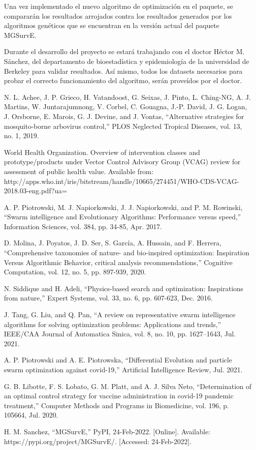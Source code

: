 \documentclass[letterpaper, 10pt, conference]{ieeeconf}
\begin{document}
Una vez implementado el nuevo algoritmo de optimización en el paquete, se compararán los resultados arrojados contra los resultados generados por los algoritmos genéticos que se encuentran en la versión actual del paquete MGSurvE. 

Durante el desarrollo del proyecto se estará trabajando con el doctor Héctor M. Sánchez, del departamento de bioestadística y epidemiología de la universidad de Berkeley para validar resultados. Así mismo, todos los datasets necesarios para probar el correcto funcionamiento del algoritmo, serán proveídos por el doctor.

\begin{thebibliography}{99}
  N. L. Achee, J. P. Grieco, H. Vatandoost, G. Seixas, J. Pinto, L. Ching-NG, A. J. Martins, W. Juntarajumnong, V. Corbel, C. Gouagna, J.-P. David, J. G. Logan, J. Orsborne, E. Marois, G. J. Devine, and J. Vontas, “Alternative strategies for mosquito-borne arbovirus control,” PLOS Neglected Tropical Diseases, vol. 13, no. 1, 2019. 
  
  World Health Organization. Overview of intervention classes and prototype/products under Vector Control Advisory Group (VCAG) review for assessment of public health value. Available from: http://apps.who.int/iris/bitstream/handle/10665/274451/WHO-CDS-VCAG-2018.03-eng.pdf?ua=

  A. P. Piotrowski, M. J. Napiorkowski, J. J. Napiorkowski, and P. M. Rowinski, “Swarm intelligence and Evolutionary Algorithms: Performance versus speed,” Information Sciences, vol. 384, pp. 34-85, Apr. 2017.  

  D. Molina, J. Poyatos, J. D. Ser, S. García, A. Hussain, and F. Herrera, “Comprehensive taxonomies of nature- and bio-inspired optimization: Inspiration Versus Algorithmic Behavior, critical analysis recommendations,” Cognitive Computation, vol. 12, no. 5, pp. 897-939, 2020. 

  N. Siddique and H. Adeli, “Physics-based search and optimization: Inspirations from nature,” Expert Systems, vol. 33, no. 6, pp. 607-623, Dec. 2016. 

  J. Tang, G. Liu, and Q. Pan, “A review on representative swarm intelligence algorithms for solving optimization problems: Applications and trends,” IEEE/CAA Journal of Automatica Sinica, vol. 8, no. 10, pp. 1627–1643, Jul. 2021.

  A. P. Piotrowski and A. E. Piotrowska, “Differential Evolution and particle swarm optimization against covid-19,” Artificial Intelligence Review, Jul. 2021. 

  G. B. Libotte, F. S. Lobato, G. M. Platt, and A. J. Silva Neto, “Determination of an optimal control strategy for vaccine administration in covid-19 pandemic treatment,” Computer Methods and Programs in Biomedicine, vol. 196, p. 105664, Jul. 2020. 
  
  H. M. Sanchez, “MGSurvE,” PyPI, 24-Feb-2022. [Online]. Available: https://pypi.org/project/MGSurvE/. [Accessed: 24-Feb-2022]. 
\end{thebibliography}
\end{document}
